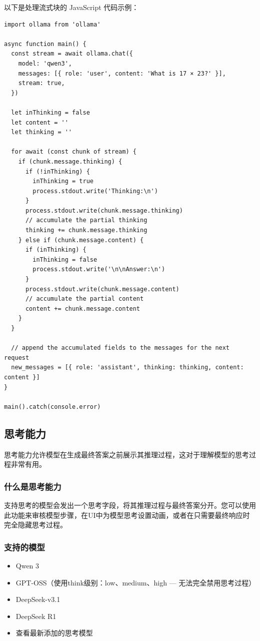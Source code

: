 \documentclass[12pt,UTF8]{ctexbook}
\begin{document}
以下是处理流式块的 JavaScript 代码示例：
\begin{verbatim}
import ollama from 'ollama' 

async function main() { 
  const stream = await ollama.chat({ 
    model: 'qwen3', 
    messages: [{ role: 'user', content: 'What is 17 × 23?' }], 
    stream: true, 
  }) 

  let inThinking = false 
  let content = '' 
  let thinking = '' 

  for await (const chunk of stream) { 
    if (chunk.message.thinking) { 
      if (!inThinking) { 
        inThinking = true 
        process.stdout.write('Thinking:\n') 
      } 
      process.stdout.write(chunk.message.thinking) 
      // accumulate the partial thinking 
      thinking += chunk.message.thinking 
    } else if (chunk.message.content) { 
      if (inThinking) { 
        inThinking = false 
        process.stdout.write('\n\nAnswer:\n') 
      } 
      process.stdout.write(chunk.message.content) 
      // accumulate the partial content 
      content += chunk.message.content 
    } 
  } 

  // append the accumulated fields to the messages for the next request 
  new_messages = [{ role: 'assistant', thinking: thinking, content: content }] 
} 

main().catch(console.error)
\end{verbatim}

\subsection{思考能力}
思考能力允许模型在生成最终答案之前展示其推理过程，这对于理解模型的思考过程非常有用。

\subsubsection{什么是思考能力}
支持思考的模型会发出一个思考字段，将其推理过程与最终答案分开。您可以使用此功能来审核模型步骤，在UI中为模型思考设置动画，或者在只需要最终响应时完全隐藏思考过程。

\subsubsection{支持的模型}
\begin{itemize}
  \item Qwen 3
  \item GPT-OSS（使用think级别：low、medium、high — 无法完全禁用思考过程）
  \item DeepSeek-v3.1
  \item DeepSeek R1
  \item 查看最新添加的思考模型
\end{itemize}
\end{document}
